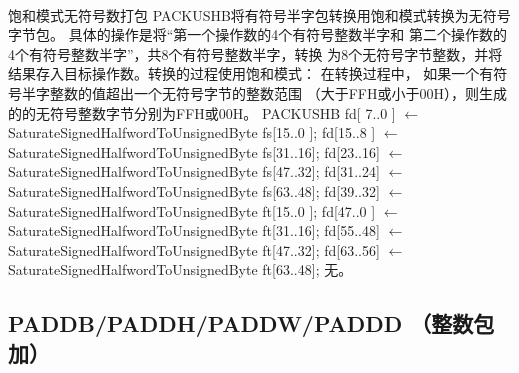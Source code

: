 \begin{instructionblk}
   \\
  {饱和模式无符号数打包}
  {PACKUSHB将有符号半字包转换用饱和模式转换为无符号字节包。
  具体的操作是将``第一个操作数的4个有符号整数半字和
  第二个操作数的4个有符号整数半字''，共8个有符号整数半字，转换
  为8个无符号字节整数，并将结果存入目标操作数。转换的过程使用饱和模式：
  在转换过程中， 如果一个有符号半字整数的值超出一个无符号字节的整数范围
  （大于FFH或小于00H），则生成的的无符号整数字节分别为FFH或00H。}
  {PACKUSHB \narrownewline
  fd[ 7..0 ] $\leftarrow$ SaturateSignedHalfwordToUnsignedByte fs[15..0 ]; \narrownewline
  fd[15..8 ] $\leftarrow$ SaturateSignedHalfwordToUnsignedByte fs[31..16]; \narrownewline
  fd[23..16] $\leftarrow$ SaturateSignedHalfwordToUnsignedByte fs[47..32]; \narrownewline
  fd[31..24] $\leftarrow$ SaturateSignedHalfwordToUnsignedByte fs[63..48]; \narrownewline
  fd[39..32] $\leftarrow$ SaturateSignedHalfwordToUnsignedByte ft[15..0 ]; \narrownewline
  fd[47..0 ] $\leftarrow$ SaturateSignedHalfwordToUnsignedByte ft[31..16]; \narrownewline
  fd[55..48] $\leftarrow$ SaturateSignedHalfwordToUnsignedByte ft[47..32]; \narrownewline
  fd[63..56] $\leftarrow$ SaturateSignedHalfwordToUnsignedByte ft[63..48];}
  {无。}
\end{instructionblk}


\subsection{PADDB/PADDH/PADDW/PADDD （整数包加）}


